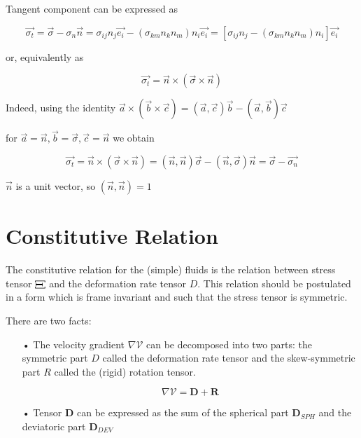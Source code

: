 \documentclass{article}
\begin{document}
{Tangent component can be expressed as 

$$\overrightarrow{\sigma_{t}} = \overrightarrow{\sigma} - \sigma_{n}\overrightarrow{n} = \sigma_{ij}n_{j}\overrightarrow{e_{i}} - (\sigma_{km}n_{k}n_{m})n_{i}\overrightarrow{e_{i}} = [\sigma_{ij}n_{j} - (\sigma_{km}n_{k}n_{m})n_{i}]\overrightarrow{e_{i}}$$

or, equivalently as

$$\overrightarrow{\sigma_{t}} = \overrightarrow{n}\times(\overrightarrow{\sigma}\times \overrightarrow{n})$$

Indeed, using the identity $\overrightarrow{a}\times(\overrightarrow{b}\times \overrightarrow{c}) = (\overrightarrow{a},\overrightarrow{c})\overrightarrow{b} - (\overrightarrow{a},\overrightarrow{b})\overrightarrow{c}$

for $\overrightarrow{a} = \overrightarrow{n}, \overrightarrow{b} = \overrightarrow{\sigma}, \overrightarrow{c} = \overrightarrow{n}$ we obtain

$$\overrightarrow{\sigma_{t}} = \overrightarrow{n}\times(\overrightarrow{\sigma}\times \overrightarrow{n}) = (\overrightarrow{n},\overrightarrow{n})\overrightarrow{\sigma} - (\overrightarrow{n},\overrightarrow{\sigma})\overrightarrow{n} = \overrightarrow{\sigma} - \overrightarrow{\sigma_{n}}$$

$\overrightarrow{n}$ is a unit vector, so $(\overrightarrow{n},\overrightarrow{n}) = 1$ 


\section*{Constitutive Relation}

The constitutive relation for the (simple) fluids is the relation between stress tensor $\rotatebox[origin=c]{90}{\textbf{[I]}}$ and the deformation rate tensor $\mathit{D}$. This relation should be postulated in a form which is frame invariant and such that the stress tensor is symmetric.

There are two facts:

\begin{itemize}
\item[•] The velocity gradient $\nabla\mathcal{V}$ can be decomposed into two parts: the symmetric part $\mathit{D}$ called the deformation rate tensor and the skew-symmetric part $\mathit{R}$ called the (rigid) rotation tensor.

$$\nabla\mathcal{V} = \mathbf{D} + \mathbf{R}$$

\item[•] Tensor $\mathbf{D}$ can be expressed as the sum of the spherical part $\mathbf{D}_{SPH}$ and the deviatoric part $\mathbf{D}_{DEV}$


\end{itemize}}
\end{document}
